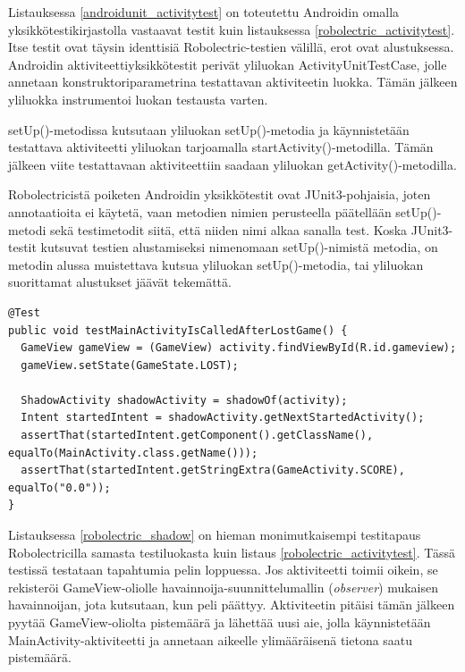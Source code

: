 Listauksessa \ref{androidunit_activitytest} on toteutettu Androidin omalla yksikkötestikirjastolla vastaavat testit kuin listauksessa \ref{robolectric_activitytest}. Itse testit ovat täysin identtisiä Robolectric-testien välillä, erot ovat alustuksessa. Androidin aktiviteettiyksikkötestit perivät yliluokan ActivityUnitTestCase, jolle annetaan konstruktoriparametrina testattavan aktiviteetin luokka. Tämän jälkeen yliluokka instrumentoi luokan testausta varten.

setUp()-metodissa kutsutaan yliluokan setUp()-metodia ja käynnistetään testattava aktiviteetti yliluokan tarjoamalla startActivity()-metodilla. Tämän jälkeen viite testattavaan aktiviteettiin saadaan yliluokan getActivity()-metodilla.

Robolectricistä poiketen Androidin yksikkötestit ovat JUnit3-pohjaisia, joten annotaatioita ei käytetä, vaan metodien nimien perusteella päätellään setUp()-metodi sekä testimetodit siitä, että niiden nimi alkaa sanalla test. Koska JUnit3-testit kutsuvat testien alustamiseksi nimenomaan setUp()-nimistä metodia, on metodin alussa muistettava kutsua yliluokan setUp()-metodia, tai yliluokan suorittamat alustukset jäävät tekemättä.

\begin{lstlisting}[float,label=robolectric_shadow,caption=Aikeen tilatietojen tarkastelu Robolectricin varjo-olioilla]
@Test
public void testMainActivityIsCalledAfterLostGame() {
  GameView gameView = (GameView) activity.findViewById(R.id.gameview);
  gameView.setState(GameState.LOST);
  	
  ShadowActivity shadowActivity = shadowOf(activity);
  Intent startedIntent = shadowActivity.getNextStartedActivity();
  assertThat(startedIntent.getComponent().getClassName(), equalTo(MainActivity.class.getName()));
  assertThat(startedIntent.getStringExtra(GameActivity.SCORE), equalTo("0.0"));
}
\end{lstlisting}

Listauksessa \ref{robolectric_shadow} on hieman monimutkaisempi testitapaus Robolectricilla samasta testiluokasta kuin listaus \ref{robolectric_activitytest}. Tässä testissä testataan tapahtumia pelin loppuessa. Jos aktiviteetti toimii oikein, se rekisteröi GameView-oliolle havainnoija-suunnittelumallin (\emph{observer}) mukaisen havainnoijan, jota kutsutaan, kun peli päättyy. Aktiviteetin pitäisi tämän jälkeen pyytää GameView-oliolta pistemäärä ja lähettää uusi aie, jolla käynnistetään MainActivity-aktiviteetti ja annetaan aikeelle ylimääräisenä tietona saatu pistemäärä.

